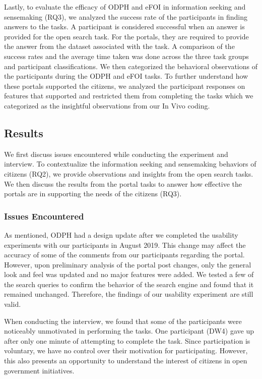 \documentclass{sigchi}
\begin{document}
Lastly, to evaluate the efficacy of ODPH and eFOI in information seeking and sensemaking (RQ3), we analyzed the success rate of the participants in finding answers to the tasks. A participant is considered successful when an answer is provided for the open search task. For the portals, they are required to provide the answer from the dataset associated with the task. A comparison of the success rates and the average time taken was done across the three task groups and participant classifications. We then categorized the behavioral observations of the participants during the ODPH and eFOI tasks. To further understand how these portals supported the citizens, we analyzed the participant responses on features that supported and restricted them from completing the tasks which we categorized as the insightful observations from our In Vivo coding. 

\subsection{Results}
We first discuss issues encountered while conducting the experiment and interview. To contextualize the information seeking and sensemaking behaviors of citizens (RQ2), we provide observations and insights from the open search tasks. We then discuss the results from the portal tasks to answer how effective the portals are in supporting the needs of the citizens (RQ3).


\subsubsection{Issues Encountered}
As mentioned, ODPH had a design update after we completed the usability experiments with our participants in August 2019. This change may affect the accuracy of some of the comments from our participants regarding the portal. However, upon preliminary analysis of the portal post changes, only the general look and feel was updated and no major features were added. We tested a few of the search queries to confirm the behavior of the search engine and found that it remained unchanged. Therefore, the findings of our usability experiment are still valid.

When conducting the interview, we found that some of the participants were noticeably unmotivated in performing the tasks. One participant (DW4) gave up after only one minute of attempting to complete the task. Since participation is voluntary, we have no control over their motivation for participating. However, this also presents an opportunity to understand the interest of citizens in open government initiatives.
\end{document}
